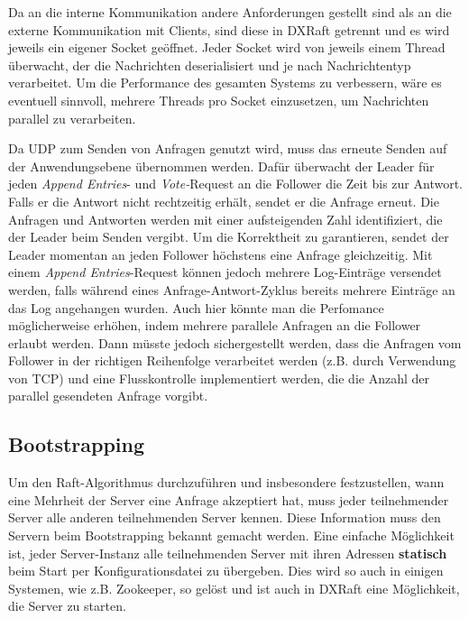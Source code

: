 Da an die interne Kommunikation andere Anforderungen gestellt sind als an die externe Kommunikation mit Clients, sind diese in DXRaft getrennt und es wird jeweils ein eigener Socket geöffnet. Jeder Socket wird von jeweils einem Thread überwacht, der die Nachrichten deserialisiert und je nach Nachrichtentyp verarbeitet. Um die Performance des gesamten Systems zu verbessern, wäre es eventuell sinnvoll, mehrere Threads pro Socket einzusetzen, um Nachrichten parallel zu verarbeiten.

Da UDP zum Senden von Anfragen genutzt wird, muss das erneute Senden auf der Anwendungsebene übernommen werden. Dafür überwacht der Leader für jeden \textit{Append Entries}- und \textit{Vote-}Request an die Follower die Zeit bis zur Antwort. Falls er die Antwort nicht rechtzeitig erhält, sendet er die Anfrage erneut. Die Anfragen und Antworten werden mit einer aufsteigenden Zahl identifiziert, die der Leader beim Senden vergibt. Um die Korrektheit zu garantieren, sendet der Leader momentan an jeden Follower höchstens eine Anfrage gleichzeitig. Mit einem \textit{Append Entries}-Request können jedoch mehrere Log-Einträge versendet werden, falls während eines Anfrage-Antwort-Zyklus bereits mehrere Einträge an das Log angehangen wurden. Auch hier könnte man die Perfomance möglicherweise erhöhen, indem mehrere parallele Anfragen an die Follower erlaubt werden. Dann müsste jedoch sichergestellt werden, dass die Anfragen vom Follower in der richtigen Reihenfolge verarbeitet werden (z.B. durch Verwendung von TCP) und eine Flusskontrolle implementiert werden, die die Anzahl der parallel gesendeten Anfrage vorgibt.

\subsection{Bootstrapping}

Um den Raft-Algorithmus durchzuführen und insbesondere festzustellen, wann eine Mehrheit der Server eine Anfrage akzeptiert hat, muss jeder teilnehmender Server alle anderen teilnehmenden Server kennen. Diese Information muss den Servern beim Bootstrapping bekannt gemacht werden. Eine einfache Möglichkeit ist, jeder Server-Instanz alle teilnehmenden Server mit ihren Adressen \textbf{statisch} beim Start per Konfigurationsdatei zu übergeben. Dies wird so auch in einigen Systemen, wie z.B. Zookeeper, so gelöst und ist auch in DXRaft eine Möglichkeit, die Server zu starten. 

